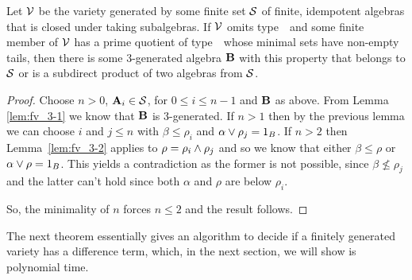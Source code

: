 

\begin{theorem}\label{thm:fv_3-4}
Let $\mathcal{V}$ be the variety generated by some finite set $\mathcal{S}$ of finite,
idempotent algebras that is closed under taking subalgebras. If\/ $\mathcal{V}$
omits type~\utyp\ and some finite member of $\mathcal{V}$ has a prime quotient 
of type~\atyp\
whose minimal sets have non-empty tails, then there is some
3-generated algebra $\mathbf{B}$ with this property that belongs to $\mathcal{S}$ or is a subdirect
product of two algebras from $\mathcal{S}$. 
\end{theorem}
\begin{proof}
Choose $n > 0$, $\mathbf{A}_i \in \mathcal{S}$, for $0 \le i \le n-1$ and $\mathbf{B}$
as above. From Lemma \ref{lem:fv_3-1} we know that $\mathbf{B}$ is
3-generated. If $n > 1$ then by the previous lemma we can choose $i$
and $j \le n$ with $\beta \le \rho_i$ and $\alpha \join \rho_j =
1_B$. If $n > 2$ then Lemma~\ref{lem:fv_3-2} applies to $\rho = \rho_i
\meet \rho_j$ and so we know that either $\beta \le \rho$ or $\alpha
\join \rho = 1_B$. This yields a contradiction as the former is not
possible, since $\beta \not\le \rho_j$ and the latter can't hold
since both $\alpha$ and $\rho$ are below $\rho_i$.

So, the minimality of $n$ forces $n\le 2$ and the result follows.
\end{proof}


The next theorem essentially gives an algorithm to decide if a finitely
generated variety has a difference term, which, in the next section, we 
will show is polynomial time. 

